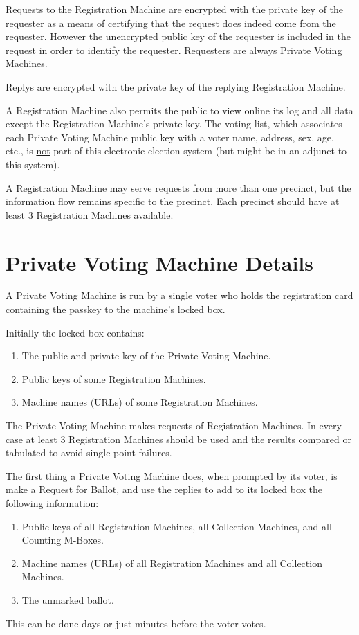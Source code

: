 \documentclass[12pt]{article}
\begin{document}
Requests to the Registration Machine are encrypted with the
private key of the requester as a means of certifying that
the request does indeed come from the requester.  However the
unencrypted public key of the requester is included in the
request in order to identify the requester.  Requesters are
always Private Voting Machines.

Replys are encrypted with the private key of the replying Registration Machine.

A Registration Machine also permits the public to view online
its log and all data except the Registration Machine's
private key.  The voting list, which associates each Private
Voting Machine public key with a voter name, address, sex,
age, etc., is \underline{not} part of this electronic
election system (but might be in an adjunct to this system).

A Registration Machine may serve requests from more than
one precinct, but the information flow remains specific
to the precinct.  Each precinct should have at least 3
Registration Machines available.

\section{Private Voting Machine Details}

A Private Voting Machine is run by a single voter
who holds the registration card containing the passkey to
the machine's locked box.

Initially the locked box contains:
\begin{enumerate}
\item The public and private key of the Private Voting Machine.
\item Public keys of some Registration Machines.
\item Machine names (URLs) of some Registration Machines.
\setcounter{PVM-COUNTER}{\value{enumi}}
\end{enumerate}

The Private Voting Machine
makes requests of Registration Machines.  In every case
at least 3 Registration Machines should be used and the
results compared or tabulated to avoid single point failures.

The first thing a Private Voting Machine does, when prompted by
its voter, is make a Request for Ballot, and use the replies to
add to its locked box the following information:
\begin{enumerate}
\setcounter{enumi}{\value{PVM-COUNTER}}
\item Public keys of all Registration Machines, all Collection
Machines, and all Counting M-Boxes.
\item Machine names (URLs) of all Registration Machines and all Collection
Machines.
\item The unmarked ballot.
\end{enumerate}
This can be done days or just minutes before the voter votes.
\end{document}
